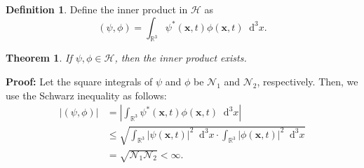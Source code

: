 \documentclass[12pt]{article}
\newcommand{\Diff}[1]{\mathop{}\!\mathrm{d}^{#1}}
\newtheorem{theorem}{Theorem}[section]
\theoremstyle{definition}
\newtheorem{definition}{Definition}[section]
\theoremstyle{remark}
\begin{document}
\begin{definition}
	Define the inner product in $\mathcal{H}$ as
	\[
		(\psi, \phi) = \int_{\mathbb{R}^3} \psi^{\ast}(\mathbf{x}, t) \phi(\mathbf{x}, t)\Diff3 x
	.\]
\end{definition}

\begin{theorem}
	If $\psi, \phi \in \mathcal{H}$, then the inner product exists.
\end{theorem}

\begin{adjustbox}{minipage = \columnwidth - 25.5pt, margin=1em, frame=1pt, margin=0em}
\textbf{Proof:} Let the square integrals of $\psi$ and $\phi$ be $\mathcal{N}_1$ and $\mathcal{N}_2$, respectively. Then, we use the Schwarz inequality as follows:
\begin{align*}
	|(\psi, \phi)| &= \left| \int_{\mathbb{R}^3} \psi^{\ast}(\mathbf{x}, t) \phi(\mathbf{x}, t) \Diff3 x \right| \\
		       &\leq \sqrt{\int_{\mathbb{R}^3} |\psi(\mathbf{x}, t)|^2\Diff3 x \cdot \int_{\mathbb{R}^3}|\phi(\mathbf{x}, t)|^2\Diff3 x} \\
		       &= \sqrt{\mathcal{N}_1\mathcal{N}_2} < \infty.
\end{align*}
\end{adjustbox}



\newpage

\printindex
\end{document}
